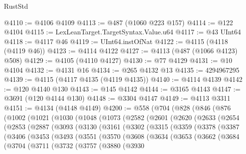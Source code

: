 \begin{lexlean}{RustStd}
\begin{coremodule}
{\begin{coremodule}
{{{{{{{{{{{{{{{{{{{{{{{{{{{{{{{{{{{{{{{{{{{{{{{{{{{{{{{{{{{{@4110 := @4106 @4109
@4113 := @487 (@1060 @223 @157)
@4114 := @122 @4104
@4115 := LexLeanTarget.TargetSyntax.Value.u64
@4117 := @43 UInt64
@4118 := @4117 @46
@4119 := UInt64.instOfNat
@4122 := @4115 (@4118 (@4119 @46))
@4123 := @4114 @4122
@4127 := @4113 (@487 (@1066 @4123) @508)
@4129 := @4105 (@4110 @4127)
@4130 := @77 @4129
@4131 := @10 @4104
@4132 := @4131 @16
@4134 := @265 @4132 @13
@4135 := 4294967295
@4139 := @4115 (@4117 @4135 (@4119 @4135))
@4140 := @4114 @4139
@4142 := @120 @4140 @130
@4143 := @145 @4142
@4144 := @3165 @4143
@4147 := @3691 (@120 @4144 @130)
@4148 := @3304 @4147
@4149 := @4113 @3311
@4151 := @4134 (@4148 @4149)
@4200 := @558
    (@704
      (@828
        (@846
          (@876
            (@1002
              (@1021
                (@1030
                  (@1048
                    (@1073
                      (@2582
                        (@2601
                          (@2620
                            (@2633
                              (@2654
                                (@2853
                                  (@2887
                                    (@3093
                                      (@3130
                                        (@3161
                                          (@3302
                                            (@3315
                                              (@3359
                                                (@3378
                                                  (@3387
                                                    (@3406
                                                      (@3453
                                                        (@3493
                                                          (@3551
                                                            (@3570
                                                              (@3608
                                                                (@3634
                                                                  (@3653
                                                                    (@3662
                                                                      (@3684
                                                                        (@3704
                                                                          (@3711
                                                                            (@3732
                                                                              (@3757
                                                                                (@3880
                                                                                  (@3930
}}}}}}}}}}}}}}}}}}}}}}}}}}}}}}}}}}}}}}}}}}}}}}}}}}}}}}}}}}}}
\end{coremodule}}
\end{coremodule}
\end{lexlean}

